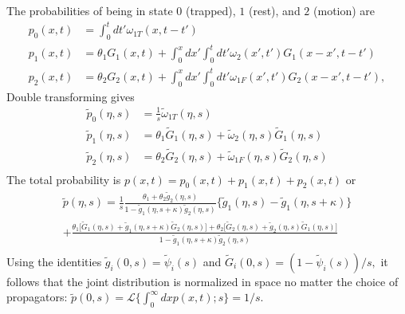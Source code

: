 \documentclass[]{agujournal2018}
\newcommand\tom{\tilde{\omega}}
\newcommand\tg{\tilde{g}}
\newcommand\tp{\tilde{p}}
\newcommand\tG{\tilde{G}}
\begin{document}
The probabilities of being in state $0$ (trapped), $1$ (rest), and $2$ (motion) are
\begin{align}
p_0(x,t) &= \int_0^t dt' \omega_{1T}(x,t-t')\\
p_1(x,t) &= \theta_1 G_1(x,t) + \int_0^x dx' \int_0^t dt' \omega_2(x',t')G_1(x-x',t-t')\\
p_2(x,t) &= \theta_2 G_2(x,t) + \int_0^x dx' \int_0^t dt' \omega_{1F}(x',t')G_2(x-x',t-t'),
\end{align}
Double transforming gives
\begin{align}
\tp_0(\eta,s) &= \frac{1}{s}\tom_{1T}(\eta,s)\\
\tp_1(\eta,s) &= \theta_1 \tG_1(\eta,s) + \tom_2(\eta,s) \tG_1(\eta,s) \\
\tp_2(\eta,s) &= \theta_2 \tG_2(\eta,s) + \tom_{1F}(\eta,s)\tG_2(\eta,s)\\
\end{align}
The total probability is $p(x,t) = p_0(x,t) + p_1(x,t) + p_2(x,t)$ or 
\begin{multline}
\tp(\eta,s) = \frac{1}{s}\frac{\theta_1 + \theta_2 \tg_2(\eta,s)}{1-\tg_1(\eta,s+\kappa)\tg_2(\eta,s)}\big\{\tg_1(\eta,s)-\tg_1(\eta,s+\kappa) \big\} \\
+\frac{\theta_1\big[\tG_1(\eta,s) + \tg_1(\eta,s+\kappa)\tG_2(\eta,s)\big]+ \theta_2\big[\tG_2(\eta,s) + \tg_2(\eta,s)\tG_1(\eta,s)\big]}{1-\tg_1(\eta,s+\kappa)\tg_2(\eta,s)} \\
\end{multline}
Using the identities $\tg_i(0,s) = \tilde{\psi}_i(s)$ and $\tG_i(0,s) = (1-\tilde{\psi}_i(s))/s,$ it follows that the joint distribution is normalized in space no matter the choice of propagators: $\tp(0,s) = \mathcal{L}\{\int_0^\infty dx p(x,t);s\} = 1/s$.
\end{document}

